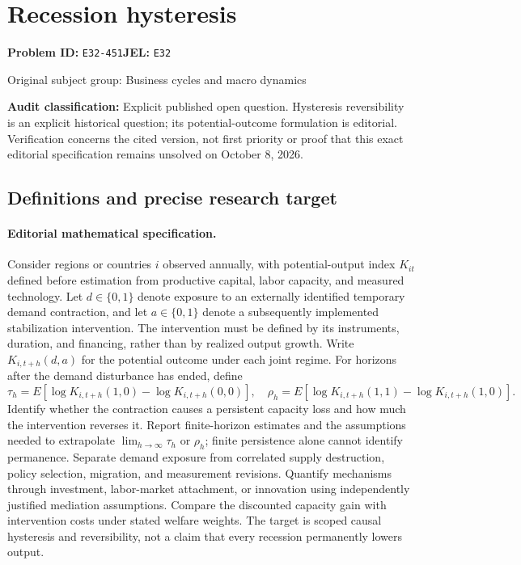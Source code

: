\documentclass[11pt,a4paper]{article}
\begin{document}
\section*{Recession hysteresis}
\textbf{Problem ID:} \texttt{E32-451}\quad \textbf{JEL:} \texttt{E32}\par
\label{problem:OP-0236}
{\sffamily\small\color{muted}Original subject group: Business cycles and macro dynamics\par}
\label{definitions:problem:30007517}
\textbf{Audit classification:} Explicit published open question. Hysteresis reversibility is an explicit historical question; its potential-outcome formulation is editorial. Verification concerns the cited version, not first priority or proof that this exact editorial specification remains unsolved on October 8, 2026.
\subsection*{Definitions and precise research target}
\paragraph{Editorial mathematical specification.} Consider regions or countries \(i\) observed annually, with potential-output index \(K_{it}\) defined before estimation from productive capital, labor capacity, and measured technology. Let \(d\in\{0,1\}\) denote exposure to an externally identified temporary demand contraction, and let \(a\in\{0,1\}\) denote a subsequently implemented stabilization intervention. The intervention must be defined by its instruments, duration, and financing, rather than by realized output growth. Write \(K_{i,t+h}(d,a)\) for the potential outcome under each joint regime.
For horizons after the demand disturbance has ended, define
\[
\tau_h=E[\log K_{i,t+h}(1,0)-\log K_{i,t+h}(0,0)],\quad
\rho_h=E[\log K_{i,t+h}(1,1)-\log K_{i,t+h}(1,0)].
\]
Identify whether the contraction causes a persistent capacity loss and how much the intervention reverses it. Report finite-horizon estimates and the assumptions needed to extrapolate \(\lim_{h\to\infty}\tau_h\) or \(\rho_h\); finite persistence alone cannot identify permanence. Separate demand exposure from correlated supply destruction, policy selection, migration, and measurement revisions. Quantify mechanisms through investment, labor-market attachment, or innovation using independently justified mediation assumptions. Compare the discounted capacity gain with intervention costs under stated welfare weights. The target is scoped causal hysteresis and reversibility, not a claim that every recession permanently lowers output.
\end{document}
